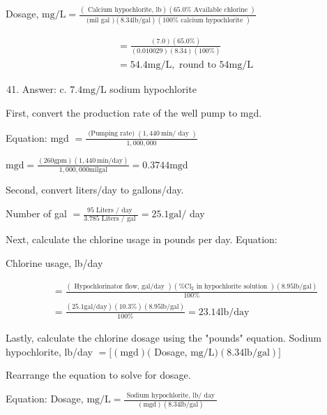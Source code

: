 \documentclass[10pt]{article}
\begin{document}
Dosage, $\mathrm{mg} / \mathrm{L}=\frac{(\text { Calcium hypochlorite, } \mathrm{lb})(65.0 \% \text { Available chlorine })}{\text { (mil gal })(8.34 \mathrm{lb} / \mathrm{gal})(100 \% \text { calcium hypochlorite })}$

$$
\begin{aligned}
&=\frac{(7.0)(65.0 \%)}{(0.010029)(8.34)(100 \%)} \\
&=54.4 \mathrm{mg} / \mathrm{L}, \text { round to } 54 \mathrm{mg} / \mathrm{L}
\end{aligned}
$$

\begin{enumerate}
  \setcounter{enumi}{40}
  \item Answer: c. $7.4 \mathrm{mg} / \mathrm{L}$ sodium hypochlorite
\end{enumerate}

First, convert the production rate of the well pump to mgd.

Equation: mgd $=\frac{\text { (Pumping rate) }(1,440 \mathrm{~min} / \text { day })}{1,000,000}$

$\mathrm{mgd}=\frac{(260 \mathrm{gpm})(1,440 \mathrm{~min} / \mathrm{day})}{1,000,000 \mathrm{mil} \mathrm{gal}}=0.3744 \mathrm{mgd}$

Second, convert liters/day to gallons/day.

Number of gal $=\frac{95 \text { Liters } / \text { day }}{3.785 \text { Liters } / \text { gal }}=25.1 \mathrm{gal} /$ day

Next, calculate the chlorine usage in pounds per day. Equation:

Chlorine usage, lb/day

$$
\begin{aligned}
&=\frac{(\text { Hypochlorinator flow, gal/day })\left(\% \mathrm{Cl}_{2} \text { in hypochlorite solution }\right)(8.95 \mathrm{lb} / \mathrm{gal})}{100 \%} \\
&=\frac{(25.1 \mathrm{gal} / \mathrm{day})(10.3 \%)(8.95 \mathrm{lb} / \mathrm{gal})}{100 \%}=23.14 \mathrm{lb} / \mathrm{day}
\end{aligned}
$$

Lastly, calculate the chlorine dosage using the "pounds" equation. Sodium hypochlorite, lb/day $=[(\mathrm{mgd})($ Dosage, $\mathrm{mg} / \mathrm{L})(8.34 \mathrm{lb} / \mathrm{gal})]$

Rearrange the equation to solve for dosage.

Equation: Dosage, $\mathrm{mg} / \mathrm{L}=\frac{\text { Sodium hypochlorite, } \mathrm{lb} / \text { day }}{(\mathrm{mgd})(8.34 \mathrm{lb} / \mathrm{gal})}$
\end{document}

